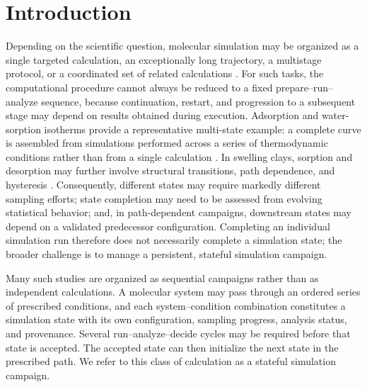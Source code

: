 \section{Introduction}
Depending on the scientific question, molecular simulation may be organized as a single targeted calculation, an exceptionally long trajectory, a multistage protocol, or a coordinated set of related calculations \cite{shaw2010,adorf2018signac}. For such tasks, the computational procedure cannot always be reduced to a fixed prepare--run--analyze sequence, because continuation, restart, and progression to a subsequent stage may depend on results obtained during execution. Adsorption and water-sorption isotherms provide a representative multi-state example: a complete curve is assembled from simulations performed across a series of thermodynamic conditions rather than from a single calculation \cite{dubbeldam2016,wang2023betgab}. In swelling clays, sorption and desorption may further involve structural transitions, path dependence, and hysteresis \cite{wang2025ca}. Consequently, different states may require markedly different sampling efforts; state completion may need to be assessed from evolving statistical behavior; and, in path-dependent campaigns, downstream states may depend on a validated predecessor configuration. Completing an individual simulation run therefore does not necessarily complete a simulation state; the broader challenge is to manage a persistent, stateful simulation campaign.

Many such studies are organized as sequential campaigns rather than as independent calculations. A molecular system may pass through an ordered series of prescribed conditions, and each system--condition combination constitutes a simulation state with its own configuration, sampling progress, analysis status, and provenance. Several run--analyze--decide cycles may be required before that state is accepted. The accepted state can then initialize the next state in the prescribed path. We refer to this class of calculation as a stateful simulation campaign.


